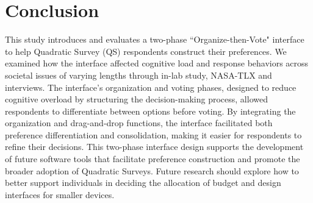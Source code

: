 \section{Conclusion}
This study introduces and evaluates a two-phase ``Organize-then-Vote" interface to help Quadratic Survey (QS) respondents construct their preferences. We examined how the interface affected cognitive load and response behaviors across societal issues of varying lengths through in-lab study, NASA-TLX and interviews. The interface’s organization and voting phases, designed to reduce cognitive overload by structuring the decision-making process, allowed respondents to differentiate between options before voting.  By integrating the organization and drag-and-drop functions, the interface facilitated both preference differentiation and consolidation, making it easier for respondents to refine their decisions. This two-phase interface design supports the development of future software tools that facilitate preference construction and promote the broader adoption of Quadratic Surveys. Future research should explore how to better support individuals in deciding the allocation of budget and design interfaces for smaller devices.
